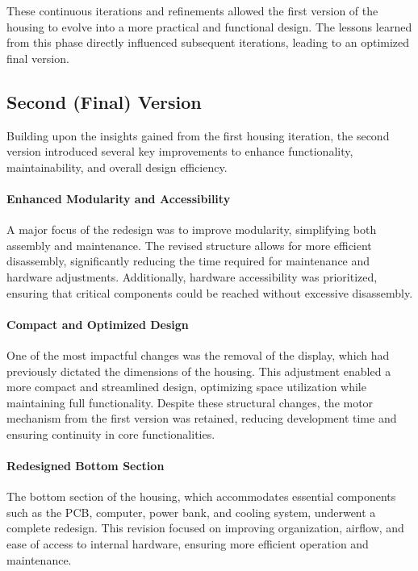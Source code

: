 These continuous iterations and refinements allowed the first version of the housing to evolve into a more practical and functional design. The lessons learned from this phase directly influenced subsequent iterations, leading to an optimized final version.  
  
  
\subsection{Second (Final) Version}
Building upon the insights gained from the first housing iteration, the second version introduced several key improvements to enhance functionality, maintainability, and overall design efficiency.  

\paragraph{Enhanced Modularity and Accessibility}  
A major focus of the redesign was to improve modularity, simplifying both assembly and maintenance. The revised structure allows for more efficient disassembly, significantly reducing the time required for maintenance and hardware adjustments. Additionally, hardware accessibility was prioritized, ensuring that critical components could be reached without excessive disassembly.  

\paragraph{Compact and Optimized Design}  
One of the most impactful changes was the removal of the display, which had previously dictated the dimensions of the housing. This adjustment enabled a more compact and streamlined design, optimizing space utilization while maintaining full functionality. Despite these structural changes, the motor mechanism from the first version was retained, reducing development time and ensuring continuity in core functionalities.  

\paragraph{Redesigned Bottom Section}  
The bottom section of the housing, which accommodates essential components such as the PCB, computer, power bank, and cooling system, underwent a complete redesign. This revision focused on improving organization, airflow, and ease of access to internal hardware, ensuring more efficient operation and maintenance.  

